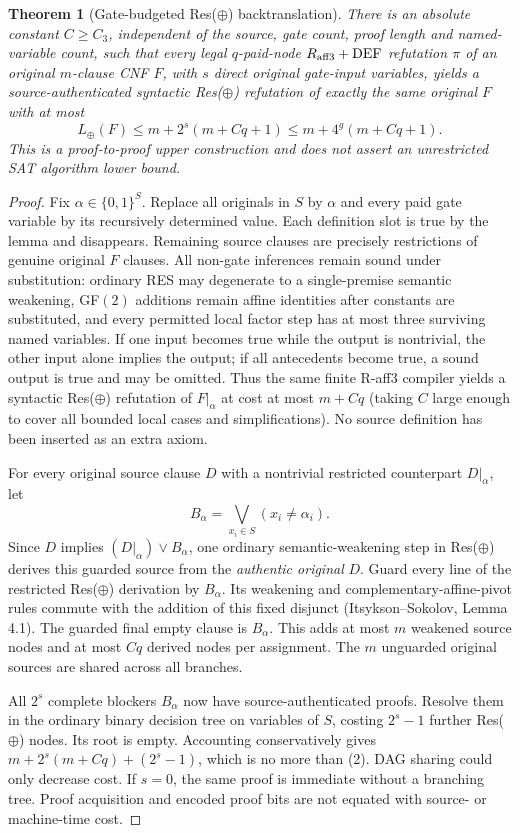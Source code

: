 \documentclass[11pt]{article}
\newtheorem{theorem}{Theorem}
\begin{document}
\begin{theorem}[Gate-budgeted Res($\oplus$) backtranslation]
There is an absolute constant $C\ge C_3$, independent of the source, gate count, proof length and named-variable count, such that every legal $q$-paid-node $R_{\rm aff3}+\mathrm{DEF}$ refutation $\pi$ of an original $m$-clause CNF $F$, with $s$ direct original gate-input variables, yields a source-authenticated syntactic Res($\oplus$) refutation of \emph{exactly the same original $F$} with at most
\[
 \boxed{\displaystyle L_{\oplus}(F)\le m+2^s(m+Cq+1)\le m+4^g(m+Cq+1).}\tag{2}
\]
This is a proof-to-proof \emph{upper} construction and does not assert an unrestricted SAT algorithm lower bound.
\end{theorem}
\begin{proof}
Fix $\alpha\in\{0,1\}^S$. Replace all originals in $S$ by $\alpha$ and every paid gate variable by its recursively determined value. Each definition slot is true by the lemma and disappears. Remaining source clauses are precisely restrictions of genuine original $F$ clauses. All non-gate inferences remain sound under substitution: ordinary RES may degenerate to a single-premise semantic weakening, GF$(2)$ additions remain affine identities after constants are substituted, and every permitted local factor step has at most three surviving named variables. If one input becomes true while the output is nontrivial, the other input alone implies the output; if all antecedents become true, a sound output is true and may be omitted. Thus the same finite R-aff3 compiler yields a syntactic Res($\oplus$) refutation of $F|_\alpha$ at cost at most $m+Cq$ (taking $C$ large enough to cover all bounded local cases and simplifications). No source definition has been inserted as an extra axiom.

For every original source clause $D$ with a nontrivial restricted counterpart $D|_\alpha$, let
\[
 B_\alpha=\bigvee_{x_i\in S}(x_i\ne\alpha_i).
\]
Since $D$ implies $(D|_\alpha)\vee B_\alpha$, one ordinary semantic-weakening step in Res($\oplus$) derives this guarded source from the \emph{authentic original} $D$. Guard every line of the restricted Res($\oplus$) derivation by $B_\alpha$. Its weakening and complementary-affine-pivot rules commute with the addition of this fixed disjunct (Itsykson--Sokolov, Lemma 4.1). The guarded final empty clause is $B_\alpha$. This adds at most $m$ weakened source nodes and at most $Cq$ derived nodes per assignment. The $m$ unguarded original sources are shared across all branches.

All $2^s$ complete blockers $B_\alpha$ now have source-authenticated proofs. Resolve them in the ordinary binary decision tree on variables of $S$, costing $2^s-1$ further Res($\oplus$) nodes. Its root is empty. Accounting conservatively gives $m+2^s(m+Cq)+(2^s-1)$, which is no more than (2). DAG sharing could only decrease cost. If $s=0$, the same proof is immediate without a branching tree. Proof acquisition and encoded proof bits are not equated with source- or machine-time cost.
\end{proof}
\end{document}
